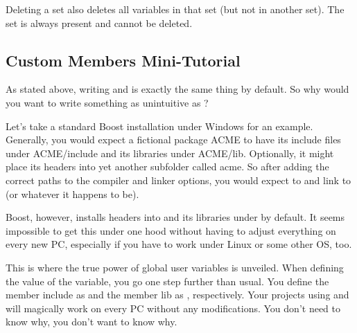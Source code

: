 Deleting a set also deletes all variables in that set (but not in another set). The  set is always present and cannot be deleted.

\subsection{Custom Members Mini-Tutorial}\label{sec:mini_tutorial}

As stated above, writing  and  is exactly the same thing by default. So why would you want to write something as unintuitive as ?

Let's take a standard Boost installation under Windows for an example. Generally, you would expect a fictional package ACME to have its include files under ACME/include and its libraries under ACME/lib. Optionally, it might place its headers into yet another subfolder called acme. So after adding the correct paths to the compiler and linker options, you would expect to  and link to  (or whatever it happens to be).

Boost, however, installs headers into  and its libraries under  by default. It seems impossible to get this under one hood without having to adjust everything on every new PC, especially if you have to work under Linux or some other OS, too.

This is where the true power of global user variables is unveiled. When defining the value of the  variable, you go one step further than usual. You define the member include as  and the member lib as , respectively. Your projects using  and  will magically work on every PC without any modifications. You don't need to know why, you don't want to know why.
